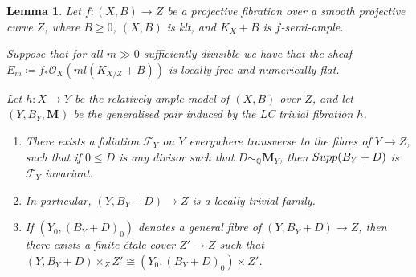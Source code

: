 \documentclass[12pt]{amsart}
\theoremstyle{plain}
\newtheorem{lemma}[theorem]{Lemma}
\theoremstyle{definition}
\def\bM#1.{\mathbf{M}_{#1}}
\begin{document}
\begin{lemma}
\label{lem_flat_to_isotrivial}
Let $f\colon (X, B) \rightarrow Z$ be a projective fibration over a 
smooth projective curve $Z$, where $B \geq 0$, $(X, B)$
is klt, and $K_X+B$ is $f$-semi-ample.


Suppose that for all $m \gg 0$ sufficiently divisible 
we have that the sheaf $E_m \coloneqq f_*\mathcal O_X(ml(K_{X/Z}+B))$ is locally free
and numerically flat.

Let $h\colon X \rightarrow Y$ be the relatively ample
model of $(X, B)$ over $Z$, and let $(Y,B_Y,\bM.)$ be the generalised pair induced by the LC trivial fibration $h$.


\begin{enumerate}
\item There exists a foliation $\mathcal F_Y$ on $Y$ everywhere transverse to the fibres of 
$Y \rightarrow Z$, such that if %
$0 \leq D$ is any divisor such that 
$D \sim_{\mathbb Q}\bM Y.$, then ${\rm Supp}(B_Y+D)$ is $\mathcal F_Y$ invariant.

\item In particular, $(Y, B_Y+D) \rightarrow Z$ is a locally trivial family.

  
\item If $(Y_0, (B_Y+D)_0)$ denotes a general
fibre of $(Y, B_Y+D) \rightarrow Z$, then there exists a finite \'etale cover $Z' \rightarrow Z$
such that $(Y, B_Y+D)\times_ZZ' \cong (Y_0, (B_Y+D)_0)\times Z'$. 


\end{enumerate}
\end{lemma}
\end{document}
